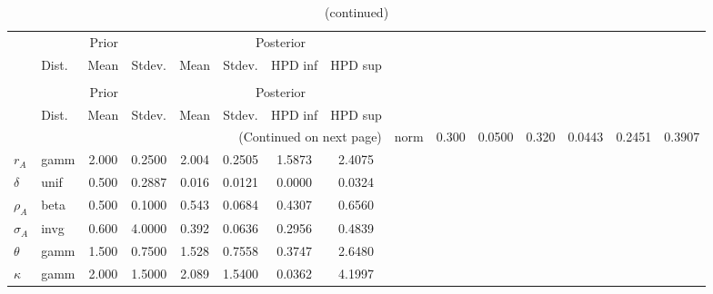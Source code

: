  
\begin{center}
\begin{longtable}{llcccccc} 
\caption{Results from Metropolis-Hastings (parameters)}
 \label{Table:MHPosterior:1}\\
\toprule 
  & \multicolumn{3}{c}{Prior}  &  \multicolumn{4}{c}{Posterior} \\
  \cmidrule(r{.75em}){2-4} \cmidrule(r{.75em}){5-8}
  & Dist. & Mean  & Stdev. & Mean & Stdev. & HPD inf & HPD sup\\
\midrule \endfirsthead 
\caption{(continued)}\\\toprule 
  & \multicolumn{3}{c}{Prior}  &  \multicolumn{4}{c}{Posterior} \\
  \cmidrule(r{.75em}){2-4} \cmidrule(r{.75em}){5-8}
  & Dist. & Mean  & Stdev. & Mean & Stdev. & HPD inf & HPD sup\\
\midrule \endhead 
\bottomrule \multicolumn{8}{r}{(Continued on next page)} \endfoot 
\bottomrule \endlastfoot 
${\alpha}$ & norm &   0.300 & 0.0500 &   0.320& 0.0443 &  0.2451 &  0.3907 \\ 
${r_{A}}$ & gamm &   2.000 & 0.2500 &   2.004& 0.2505 &  1.5873 &  2.4075 \\ 
${\delta}$ & unif &   0.500 & 0.2887 &   0.016& 0.0121 &  0.0000 &  0.0324 \\ 
${\rho_A}$ & beta &   0.500 & 0.1000 &   0.543& 0.0684 &  0.4307 &  0.6560 \\ 
${\sigma_A}$ & invg &   0.600 & 4.0000 &   0.392& 0.0636 &  0.2956 &  0.4839 \\ 
${\theta}$ & gamm &   1.500 & 0.7500 &   1.528& 0.7558 &  0.3747 &  2.6480 \\ 
${\kappa}$ & gamm &   2.000 & 1.5000 &   2.089& 1.5400 &  0.0362 &  4.1997 \\ 
\end{longtable}
 \end{center}
